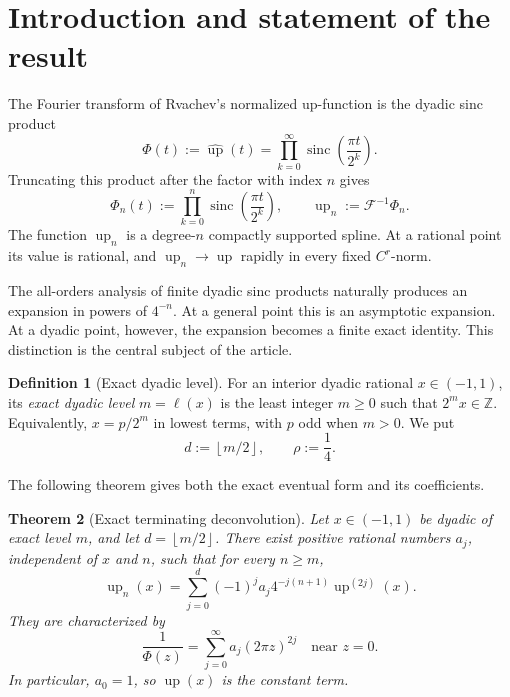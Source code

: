 \documentclass[11pt,oneside]{article}
\newtheorem{theorem}{Theorem}[section]
\theoremstyle{definition}
\newtheorem{definition}[theorem]{Definition}
\theoremstyle{remark}
\newcommand{\Z}{\mathbb Z}
\newcommand{\F}{\mathcal F}
\newcommand{\up}{\operatorname{up}}
\newcommand{\sinc}{\operatorname{sinc}}
\newcommand{\floor}[1]{\left\lfloor#1\right\rfloor}
\begin{document}
\tableofcontents

\section{Introduction and statement of the result}

The Fourier transform of Rvachev's normalized up-function is the dyadic sinc
product
\begin{equation}\label{eq:infinite-product}
 \Phi(t):=\widehat{\up}(t)
 =\prod_{k=0}^{\infty}\sinc\!\left(\frac{\pi t}{2^k}\right).
\end{equation}
Truncating this product after the factor with index \(n\) gives
\begin{equation}\label{eq:finite-product}
 \Phi_n(t):=\prod_{k=0}^{n}\sinc\!\left(\frac{\pi t}{2^k}\right),
 \qquad \up_n:=\F^{-1}\Phi_n.
\end{equation}
The function \(\up_n\) is a degree-\(n\) compactly supported spline.  At a
rational point its value is rational, and \(\up_n\to\up\) rapidly in every
fixed \(C^r\)-norm.

The all-orders analysis of finite dyadic sinc products naturally produces an
expansion in powers of \(4^{-n}\).  At a general point this is an asymptotic
expansion.  At a dyadic point, however, the expansion becomes a finite exact
identity.  This distinction is the central subject of the article.

\begin{definition}[Exact dyadic level]\label{def:level}
For an interior dyadic rational \(x\in(-1,1)\), its \emph{exact dyadic level}
\(m=\ell(x)\) is the least integer \(m\ge0\) such that \(2^m x\in\Z\).
Equivalently, \(x=p/2^m\) in lowest terms, with \(p\) odd when \(m>0\).
We put
\begin{equation}\label{eq:d-rho}
 d:=\floor{m/2},\qquad \rho:=\frac14.
\end{equation}
\end{definition}

The following theorem gives both the exact eventual form and its coefficients.

\begin{theorem}[Exact terminating deconvolution]\label{thm:main-differential}
Let \(x\in(-1,1)\) be dyadic of exact level \(m\), and let
\(d=\floor{m/2}\).  There exist positive rational numbers \(a_j\), independent
of \(x\) and \(n\), such that for every \(n\ge m\),
\begin{equation}\label{eq:main-differential}
 \boxed{\displaystyle
 \up_n(x)=\sum_{j=0}^{d}(-1)^j a_j4^{-j(n+1)}\up^{(2j)}(x).}
\end{equation}
They are characterized by
\begin{equation}\label{eq:a-generating-summary}
 \frac1{\Phi(z)}=\sum_{j=0}^{\infty}a_j(2\pi z)^{2j}
 \quad\text{near }z=0.
\end{equation}
In particular, \(a_0=1\), so \(\up(x)\) is the constant term.
\end{theorem}
\end{document}
